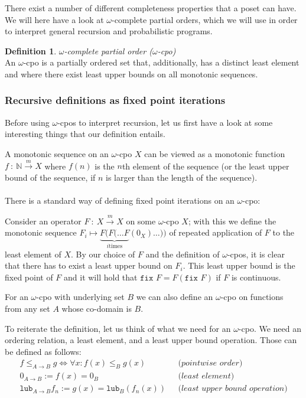 \documentclass[11pt, leqno, titlepage]{article}
\theoremstyle{definition}
\newtheorem{defn}[thm]{Definition}
\begin{document}
There exist a number of different completeness properties that a poset can have.
We will here have a look at $\omega$-complete partial orders, which we will use in
order to interpret general recursion and probabilistic programs. 

\begin{defn}
  \textit{$\omega$-complete partial order ($\omega$-cpo)}\\
  An $\omega$-cpo is a partially ordered set that, additionally, has a distinct least
  element and where there exist least upper bounds on all monotonic sequences. 
\end{defn}


\subsubsection{Recursive definitions as fixed point iterations}
\label{sec:fixp-iter}

Before using $\omega$-cpos to interpret recursion, let us first have a look at some
interesting things that our definition entails.

A monotonic sequence on an $\omega$-cpo $X$ can be viewed as a monotonic function
$f~:~\mathbb{N} \xrightarrow{m} X$ where $f(n)$ is the $n$th element of the sequence (or the
least upper bound of the sequence, if $n$ is larger than the length of the
sequence).\\
\\
There is a standard way of defining fixed point iterations on an $\omega$-cpo: \cite{rml-paper}

Consider an operator $F~:~X \xrightarrow{m} X$ on some $\omega$-cpo $X$; with this we
define the monotonic sequence $F_i \mapsto \underbrace{ F(F(\dots F}_{i \text{
    times}} (0_X) \dots))$ of repeated application of $F$ to the least element of $X$.
By our choice of $F$ and the definition of $\omega$-cpos, it is clear that there has
to exist a least upper bound on $F_i$. This least upper bound is the fixed point of
$F$ and it will hold that $\texttt{fix } F = F(\texttt{fix }F)$ if $F$ is
continuous. 

For an $\omega$-cpo with underlying set $B$ we can also define an $\omega$-cpo on
functions from any set $A$ whose co-domain is $B$.

To reiterate the definition, let us think of what we need for an $\omega$-cpo. We
need an ordering relation, a least element, and a least upper bound operation. Those
can be defined as follows:
\begin{align*}
  f\leq_{A \to B} g \Leftrightarrow \forall x: f(x) \leq_B g(x) & ~~~\textit{(pointwise order)}\\
  0_{A\to B} := f(x) = 0_B & ~~~\textit{(least element)}\\
  \texttt{lub}_{A\to B} f_n := g(x) = \texttt{lub}_B(f_n(x)) & ~~~\textit{(least upper
                                                               bound operation)}
\end{align*}
\end{document}
